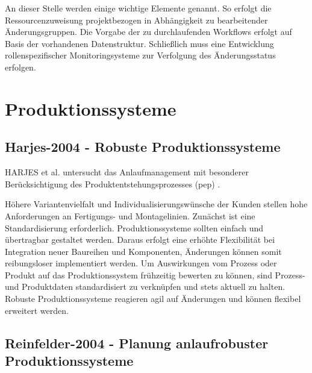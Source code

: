 An dieser Stelle werden einige wichtige Elemente genannt. So erfolgt die Ressourcenzuweisung projektbezogen in Abhängigkeit zu bearbeitender Änderungsgruppen. Die Vorgabe der zu durchlaufenden Workflows erfolgt auf Basis der vorhandenen Datenstruktur. Schließlich muss eine Entwicklung rollenspezifischer Monitoringsysteme zur Verfolgung des Änderungsstatus erfolgen. 

% 
% 
% 
\section{Produktionssysteme}

\subsection*{Harjes-2004 - Robuste Produktionssysteme}
HARJES et al. untersucht das Anlaufmanagement mit besonderer Berücksichtigung des Produktentstehungsprozesses (\gls{pep}) \autocite{Harjes2004}. 

Höhere Variantenvielfalt und Individualisierungswünsche der Kunden stellen hohe Anforderungen an Fertigungs- und Montagelinien. Zunächst ist eine Standardisierung erforderlich. Produktionssysteme sollten einfach und übertragbar gestaltet werden. Daraus erfolgt eine erhöhte Flexibilität bei Integration neuer Baureihen und Komponenten, Änderungen können somit reibungsloser implementiert werden. Um Auswirkungen vom Prozess oder Produkt auf das Produktionssystem frühzeitig bewerten zu können, sind Prozess- und Produktdaten standardisiert zu verknüpfen und stets aktuell zu halten. 
% 
Robuste Produktionssysteme reagieren agil auf Änderungen und können flexibel erweitert werden. 

\subsection*{Reinfelder-2004 - Planung anlaufrobuster Produktionssysteme}


